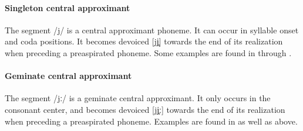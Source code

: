 \paragraph{Singleton central approximant}
The segment /j/ is a central approximant phoneme. It can occur in syllable onset and coda positions. 
It becomes devoiced [jj̥] towards the end of its realization when preceding a preaspirated phoneme. 
Some examples are found in  through . 
%

\paragraph{Geminate central approximant}
The segment /jː/ is a geminate central approximant. It only occurs in the consonant center, and becomes devoiced [jj̥ː] towards the end of its realization when preceding a preaspirated phoneme.  
Examples are found in  as well as  above.


